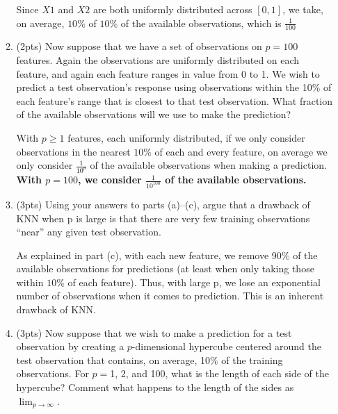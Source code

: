 \documentclass[a4paper]{article}
\theoremstyle{definition}
\newenvironment{soln}{
    \leavevmode\color{blue}\ignorespaces
}{}
\begin{document}
\begin{enumerate}
\begin{enumerate}
	\begin{soln}  Since $X1$ and $X2$ are both uniformly distributed across $[0, 1]$, we take, on average, $10\%$ of $10\%$ of the available observations, which is \textbf{$\frac{1}{100}$} \end{soln}
	
	\item (2pts) Now suppose that we have a set of observations on $p = 100$ features. Again the observations are uniformly distributed on each feature, and again each feature ranges in value from 0 to 1. We wish to predict a test observation’s response using observations within the 10\% of each feature’s range that is closest to that test observation. What fraction of the available observations will we use to make the prediction?
	
	\begin{soln}  With $p \geq 1$ features, each uniformly distributed, if we only consider observations in the nearest $10\%$ of each and every feature, on average we only consider $\frac{1}{10^p}$ of the available observations when making a prediction. \linebreak \textbf{With $p = 100$, we consider $\frac{1}{10^{100}}$ of the available observations.} \end{soln}
	
	\item (3pts) Using your answers to parts (a)–(c), argue that a drawback of KNN when p is large is that there are very few training observations “near” any given test observation.
	
	\begin{soln}  As explained in part (c), with each new feature, we remove 90\% of the available observations for predictions (at least when only taking those within $10\%$ of each feature). Thus, with large p, we lose an exponential number of observations when it comes to prediction. This is an inherent drawback of KNN. \end{soln}
	
	\item (3pts) Now suppose that we wish to make a prediction for a test observation by creating a $p$-dimensional hypercube centered around the test observation that contains, on average, 10\% of the training observations. For $p =$1, 2, and 100, what is the length of each side of the hypercube? Comment what happens to the length of the sides as $\lim_{{p \to \infty}}$.
	

\end{enumerate}
\end{enumerate}
\end{document}
